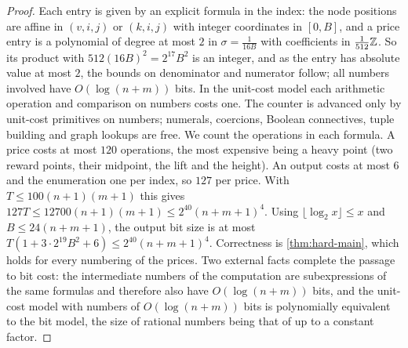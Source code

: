 \begin{proof}
Each entry is given by an explicit formula in the index: the node positions are affine in $(v,i,j)$ or $(k,i,j)$ with integer coordinates in $[0,B]$, and a price entry is a polynomial of degree at most $2$ in $\sigma=\frac1{16B}$ with coefficients in $\frac1{512}\mathbb{Z}$. So its product with $512(16B)^2=2^{17}B^2$ is an integer, and as the entry has absolute value at most $2$, the bounds on denominator and numerator follow; all numbers involved have $O(\log(n+m))$ bits. In the unit-cost model each arithmetic operation and comparison on numbers costs one. The counter is advanced only by unit-cost primitives on numbers; numerals, coercions, Boolean connectives, tuple building and graph lookups are free. We count the operations in each formula. A price costs at most $120$ operations, the most expensive being a heavy point (two reward points, their midpoint, the lift and the height). An output costs at most $6$ and the enumeration one per index, so $127$ per price. With $T\le100(n+1)(m+1)$ this gives $127T\le12700(n+1)(m+1)\le2^{40}(n+m+1)^4$. Using $\lfloor\log_2x\rfloor\le x$ and $B\le24(n+m+1)$, the output bit size is at most $T(1+3\cdot2^{19}B^2+6)\le2^{40}(n+m+1)^4$. Correctness is \cref{thm:hard-main}, which holds for every numbering of the prices. Two external facts complete the passage to bit cost: the intermediate numbers of the computation are subexpressions of the same formulas and therefore also have $O(\log(n+m))$ bits, and the unit-cost model with numbers of $O(\log(n+m))$ bits is polynomially equivalent to the bit model, the size of rational numbers being that of \citet[\S2.1]{Schrijver1986} up to a constant factor.
\end{proof}
